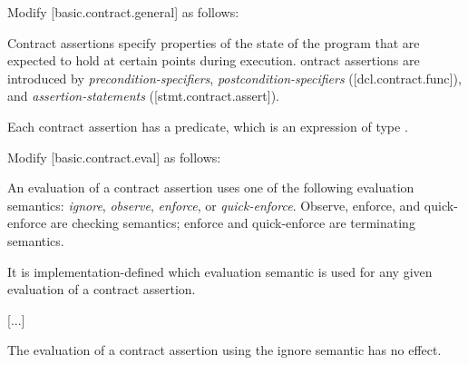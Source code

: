 Modify [basic.contract.general] as follows:

\begin{adjustwidth}{0.5cm}{0.5cm}
Contract assertions specify properties of the state of the program
that are expected to hold at certain points during execution. ontract assertions
are introduced by \emph{precondition-specifiers}, \emph{postcondition-specifiers} ([dcl.contract.func]),
and \emph{assertion-statements} ([stmt.contract.assert]). 

Each contract assertion has a predicate, which is an expression of type . 
\begin{note}
\end{note}
\end{adjustwidth}

Modify [basic.contract.eval] as follows:

\begin{adjustwidth}{0.5cm}{0.5cm}
An evaluation of a contract assertion uses one of the following  evaluation semantics: 
\emph{ignore}, 
\emph{observe}, 
\emph{enforce}, or 
\emph{quick-enforce}. 
Observe, enforce, and quick-enforce are checking semantics; enforce and quick-enforce are terminating semantics.

It is implementation-defined which evaluation semantic is used for any given evaluation of a contract assertion.  


[...]

The evaluation of a contract assertion using the ignore  semantic has no effect. 

\end{adjustwidth}

